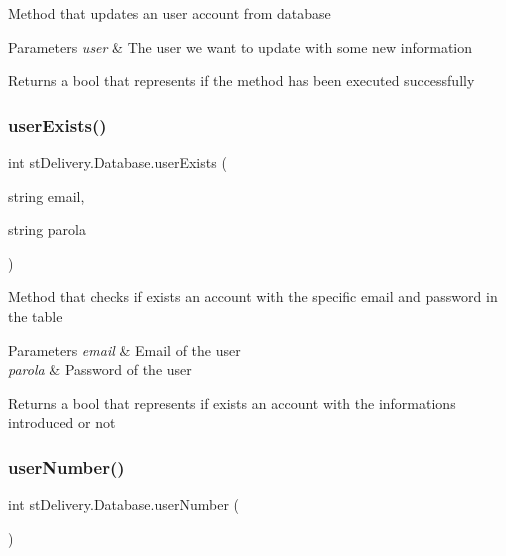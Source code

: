 Method that updates an user account from database 


\begin{DoxyParams}{Parameters}
{\em user} & The user we want to update with some new information\\
\hline
\end{DoxyParams}
\begin{DoxyReturn}{Returns}
a bool that represents if the method has been executed successfully
\end{DoxyReturn}
\mbox{\label{classst_delivery_1_1_database_afa81257b192afc5091c35e8af8e1cf09}} 
\subsubsection{\texorpdfstring{user\+Exists()}{userExists()}}
{\footnotesize\ttfamily int st\+Delivery.\+Database.\+user\+Exists (\begin{DoxyParamCaption}\item[{string}]{email,  }\item[{string}]{parola }\end{DoxyParamCaption})}



Method that checks if exists an account with the specific email and password in the table 


\begin{DoxyParams}{Parameters}
{\em email} & Email of the user\\
\hline
{\em parola} & Password of the user\\
\hline
\end{DoxyParams}
\begin{DoxyReturn}{Returns}
a bool that represents if exists an account with the informations introduced or not
\end{DoxyReturn}
\mbox{\label{classst_delivery_1_1_database_a150234bbfd66c0a5b2067de2ddc851cc}} 
\subsubsection{\texorpdfstring{user\+Number()}{userNumber()}}
{\footnotesize\ttfamily int st\+Delivery.\+Database.\+user\+Number (\begin{DoxyParamCaption}{ }\end{DoxyParamCaption})}



